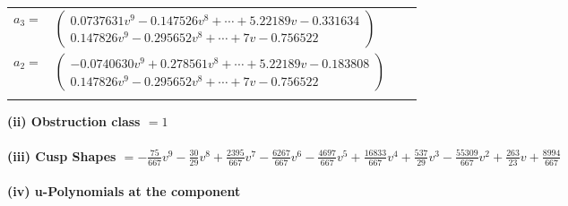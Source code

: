 \documentclass[1p]{elsarticle_modified}
\theoremstyle{definition}
\begin{document}
\begin{tabular}{m{7pt} m{180pt} m{7pt} m{180pt} }
\flushright $a_{3}=$&$\begin{pmatrix}0.0737631 v^{9}-0.147526 v^{8}+\cdots+5.22189 v-0.331634\\0.147826 v^{9}-0.295652 v^{8}+\cdots+7 v-0.756522\end{pmatrix}$ \\
\flushright $a_{2}=$&$\begin{pmatrix}-0.0740630 v^{9}+0.278561 v^{8}+\cdots+5.22189 v-0.183808\\0.147826 v^{9}-0.295652 v^{8}+\cdots+7 v-0.756522\end{pmatrix}$\\&\end{tabular}
\flushleft \textbf{(ii) Obstruction class $= 1$}\\~\\
\flushleft \textbf{(iii) Cusp Shapes $= -\frac{75}{667} v^9-\frac{30}{29} v^8+\frac{2395}{667} v^7-\frac{6267}{667} v^6-\frac{4697}{667} v^5+\frac{16833}{667} v^4+\frac{537}{29} v^3-\frac{55309}{667} v^2+\frac{263}{23} v+\frac{8994}{667}$}\\~\\
\newpage\renewcommand{\arraystretch}{1}
\flushleft \textbf{(iv) u-Polynomials at the component}\newline \\
\end{document}
